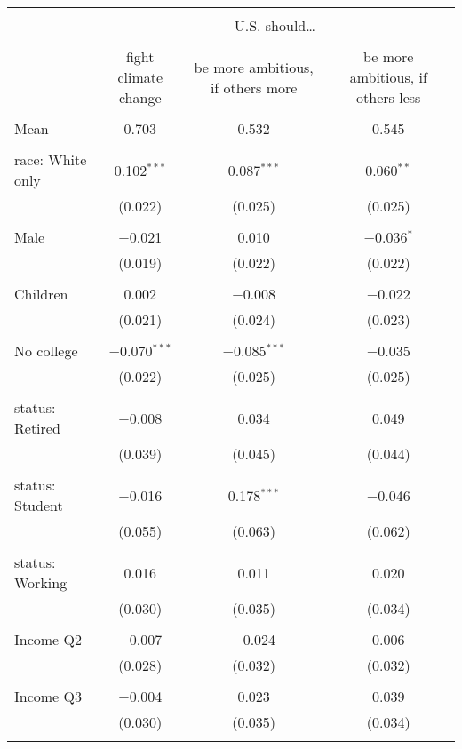 
\begin{tabular}{@{\extracolsep{5pt}}lccc} 
\\[-1.8ex]\hline 
\hline \\[-1.8ex] 
 & \multicolumn{3}{c}{U.S. should… } \\ 
\cline{2-4} 
\\[-1.8ex] & fight climate change & be more ambitious, if others more & be more ambitious, if others less \\ 
\hline \\[-1.8ex] 
 Mean & 0.703 & 0.532 & 0.545  \\ \hline \\[-1.8ex] race: White only & 0.102$^{***}$ & 0.087$^{***}$ & 0.060$^{**}$ \\ 
  & (0.022) & (0.025) & (0.025) \\ 
  & & & \\ 
 Male & $-$0.021 & 0.010 & $-$0.036$^{*}$ \\ 
  & (0.019) & (0.022) & (0.022) \\ 
  & & & \\ 
 Children & 0.002 & $-$0.008 & $-$0.022 \\ 
  & (0.021) & (0.024) & (0.023) \\ 
  & & & \\ 
 No college & $-$0.070$^{***}$ & $-$0.085$^{***}$ & $-$0.035 \\ 
  & (0.022) & (0.025) & (0.025) \\ 
  & & & \\ 
 status: Retired & $-$0.008 & 0.034 & 0.049 \\ 
  & (0.039) & (0.045) & (0.044) \\ 
  & & & \\ 
 status: Student & $-$0.016 & 0.178$^{***}$ & $-$0.046 \\ 
  & (0.055) & (0.063) & (0.062) \\ 
  & & & \\ 
 status: Working & 0.016 & 0.011 & 0.020 \\ 
  & (0.030) & (0.035) & (0.034) \\ 
  & & & \\ 
 Income Q2 & $-$0.007 & $-$0.024 & 0.006 \\ 
  & (0.028) & (0.032) & (0.032) \\ 
  & & & \\ 
 Income Q3 & $-$0.004 & 0.023 & 0.039 \\ 
  & (0.030) & (0.035) & (0.034) \\ 
  & & & \\ 

\end{tabular}
